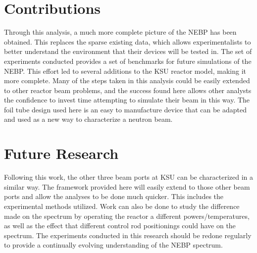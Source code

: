 \section{Contributions}
Through this analysis, a much more complete picture of the NEBP has been obtained.
This replaces the sparse existing data, which allows experimentalists to better understand the environment that their devices will be tested in.
The set of experiments conducted provides a set of benchmarks for future simulations of the NEBP.
This effort led to several additions to the KSU reactor model, making it more complete.
Many of the steps taken in this analysis could be easily extended to other reactor beam problems, and the success found here allows other analysts the confidence to invest time attempting to simulate their beam in this way.
The foil tube design used here is an easy to manufacture device that can be adapted and used as a new way to characterize a neutron beam.



\section{Future Research}
Following this work, the other three beam ports at KSU can be characterized in a similar way.
The framework provided here will easily extend to those other beam ports and allow the analyses to be done much quicker.
This includes the experimental methods utilized.
Work can also be done to study the difference made on the spectrum by operating the reactor a different powers/temperatures, as well as the effect that different control rod positionings could have on the spectrum.
The experiments conducted in this research should be redone regularly to provide a continually evolving understanding of the NEBP spectrum.

